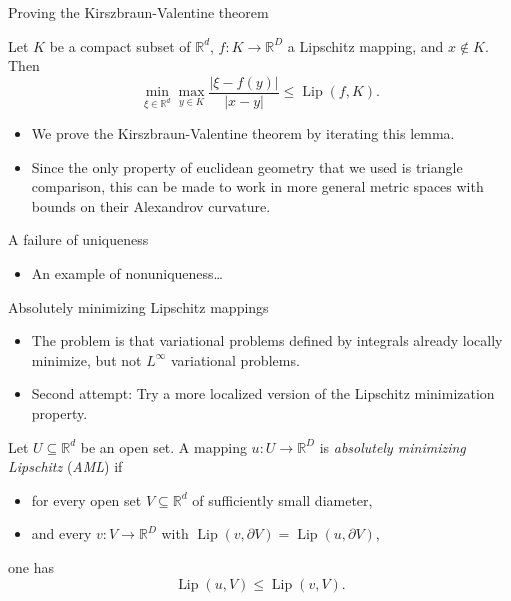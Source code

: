 \documentclass[10pt]{beamer}
\newcommand{\RR}{\mathbb{R}}
\DeclareMathOperator{\Lip}{Lip}
\begin{document}
\begin{frame}{Proving the Kirszbraun-Valentine theorem}
\begin{lemma}
Let $K$ be a compact subset of $\RR^d$, $f: K \to \RR^D$ a Lipschitz mapping, and $x \notin K$.
Then
$$\min_{\xi \in \RR^d} \max_{y \in K} \frac{|\xi - f(y)|}{|x - y|} \leq \Lip(f, K).$$
\end{lemma} \pause

\begin{itemize}
\item We prove the Kirszbraun-Valentine theorem by iterating this lemma. \pause
\item Since the only property of euclidean geometry that we used is triangle comparison, this can be made to work in more general metric spaces with bounds on their Alexandrov curvature.
\end{itemize}
\end{frame}

\begin{frame}{A failure of uniqueness}
\begin{itemize}
\item An example of nonuniqueness\dots 
\end{itemize}
\end{frame}

\begin{frame}{Absolutely minimizing Lipschitz mappings}
\begin{itemize}
\item The problem is that variational problems defined by integrals already locally minimize, but not $L^\infty$ variational problems. \pause
\item Second attempt: Try a more localized version of the Lipschitz minimization property. \pause
\end{itemize}

\begin{definition}
Let $U \subseteq \RR^d$ be an open set.
A mapping $u: U \to \RR^D$ is \emph{absolutely minimizing Lipschitz} (\emph{AML}) if \pause
\begin{itemize}
\item for every open set $V \subseteq \RR^d$ of sufficiently small diameter, \pause
\item and every $v: V \to \RR^D$ with $\Lip(v, \partial V) = \Lip(u, \partial V)$, \pause
\end{itemize}
one has
$$\Lip(u, V) \leq \Lip(v, V).$$
\end{definition}
\end{frame}
\end{document}
